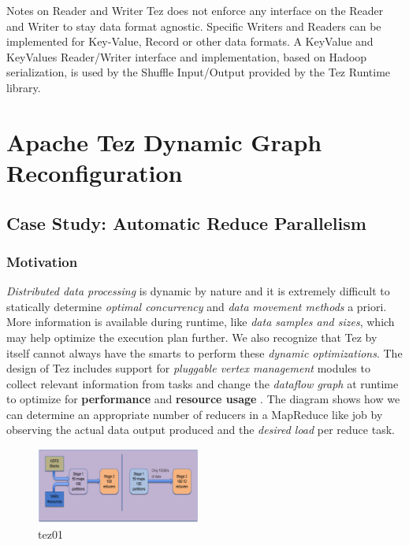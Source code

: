 \documentclass[twocolumn]{article}
\begin{document}
Notes on Reader and Writer Tez does not enforce any interface on the
Reader and Writer to stay data format agnostic. Specific Writers and
Readers can be implemented for Key-Value, Record or other data formats.
A KeyValue and KeyValues Reader/Writer interface and implementation,
based on Hadoop serialization, is used by the Shuffle Input/Output
provided by the Tez Runtime library.

\section{Apache Tez Dynamic Graph Reconfiguration}
\subsection{Case Study: Automatic Reduce Parallelism}

\subsubsection{Motivation}

\emph{Distributed data processing} is dynamic by nature and it is
extremely difficult to statically determine \emph{optimal concurrency}
and \emph{data movement methods} a priori. More information is available
during runtime, like \emph{data samples and sizes}, which may help
optimize the execution plan further. We also recognize that Tez by
itself cannot always have the smarts to perform these \emph{dynamic
optimizations}. The design of Tez includes support for \emph{pluggable
vertex management} modules to collect relevant information from tasks
and change the \emph{dataflow graph} at runtime to optimize for
\textbf{performance} and \textbf{resource usage} \cite{Saha:2013-05}. The diagram shows how
we can determine an appropriate number of reducers in a MapReduce like
job by observing the actual data output produced and the \emph{desired
load} per reduce task.

\begin{figure}[htb]
        \centering
        \includegraphics[width=0.48\textwidth]{dtez11}
        \caption{tez01}
        \label{fig15}
\end{figure}
\end{document}
